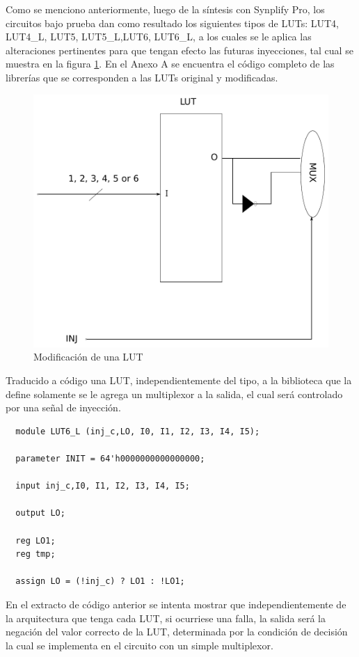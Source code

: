 Como se menciono anteriormente, luego  de la síntesis con  Synplify Pro, los circuitos  bajo prueba dan como resultado los siguientes tipos de LUTs: LUT4, LUT4\_L, LUT5, LUT5\_L,LUT6, LUT6\_L, a los cuales se le aplica las alteraciones pertinentes para que tengan efecto las futuras inyecciones, tal cual se muestra en la figura \ref{LUT}. En el Anexo A se encuentra el código completo de las librerías que se corresponden a las LUTs original y modificadas.


\begin{figure}[H]
	\centering
	\includegraphics[width=0.4 \textwidth]{img/LUT.pdf}
	\caption{Modificación de una LUT}
	\label{LUT}
\end{figure}


Traducido a código una LUT, independientemente del tipo, a la biblioteca que la define solamente se le agrega  un multiplexor a la salida, el cual será controlado por una señal de inyección. 
\begin{lstlisting}
  module LUT6_L (inj_c,LO, I0, I1, I2, I3, I4, I5);

  parameter INIT = 64'h0000000000000000;

  input inj_c,I0, I1, I2, I3, I4, I5;

  output LO;

  reg LO1;
  reg tmp;
  
  assign LO = (!inj_c) ? LO1 : !LO1;
\end{lstlisting}

En el extracto de código anterior se intenta mostrar que independientemente de la arquitectura que tenga cada LUT, si ocurriese una falla, la salida será la negación del valor correcto de la LUT, determinada por la condición de decisión la cual se implementa en el circuito con un simple  multiplexor.
